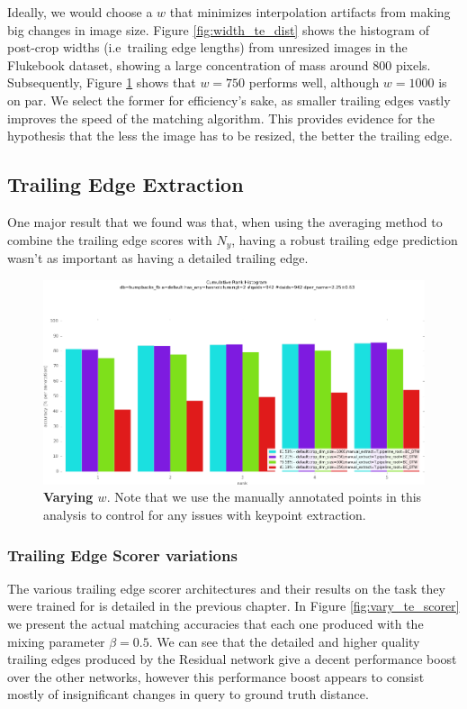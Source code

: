 Ideally, we would choose a $w$ that minimizes interpolation artifacts from making big changes in image size.
Figure \ref{fig:width_te_dist} shows the histogram of post-crop widths (i.e\ trailing edge lengths) from unresized images in the Flukebook dataset, showing a large concentration of mass around 800 pixels. 
Subsequently, Figure \ref{fig:vary_crop_size} shows that $w = 750$ performs well, although $w = 1000$ is on par.
We select the former for efficiency's sake, as smaller trailing edges vastly improves the speed of the matching algorithm.
This provides evidence for the hypothesis that the less the image has to be resized, the better the trailing edge.

\subsection{Trailing Edge Extraction}

One major result that we found was that, when using the averaging method to combine the trailing edge scores with $N_y$, having a robust trailing edge prediction wasn't as important as having a detailed trailing edge.

\begin{figure}[t]%
\centering
\includegraphics[width=1\textwidth]{../images/results/vary_crop_size.png}
\caption{\textbf{Varying $w$}. Note that we use the manually annotated points in this analysis to control for any issues with keypoint extraction.}
\label{fig:vary_crop_size}
\end{figure}


\subsubsection{Trailing Edge Scorer variations}

The various trailing edge scorer architectures and their results on the task they were trained for is detailed in the previous chapter.
In Figure \ref{fig:vary_te_scorer} we present the actual matching accuracies that each one produced with the mixing parameter $\beta = 0.5$.
We can see that the detailed and higher quality trailing edges produced by the Residual network give a decent performance boost over the other networks, however this performance boost appears to consist mostly of insignificant changes in query to ground truth distance.

